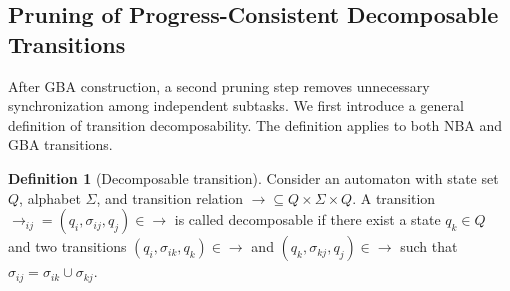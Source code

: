 \documentclass[lettersize,journal]{IEEEtran}
\theoremstyle{italiclemma}
\theoremstyle{italiclemma}
\theoremstyle{definition}
\newtheorem{definition}{Definition}
\begin{document}



\subsection{Pruning of Progress-Consistent Decomposable Transitions}
After GBA construction, a second pruning step removes unnecessary synchronization among independent subtasks.
We first introduce a general definition of transition decomposability. The definition applies to both NBA and GBA transitions.



\begin{definition}[Decomposable transition]
\label{def:decomposable_transition}
Consider an automaton with state set $Q$, alphabet $\Sigma$, and transition relation $\rightarrow\subseteq Q\times\Sigma\times Q$.
A transition $\rightarrow_{ij}=(q_i,\sigma_{ij},q_j)\in\rightarrow$ is called decomposable if there exist a state $q_k\in Q$ and two
transitions $(q_i,\sigma_{ik},q_k)\in\rightarrow$ and $(q_k,\sigma_{kj},q_j)\in\rightarrow$ such that
$\sigma_{ij}=\sigma_{ik}\cup\sigma_{kj}$.
\end{definition}
\end{document}
